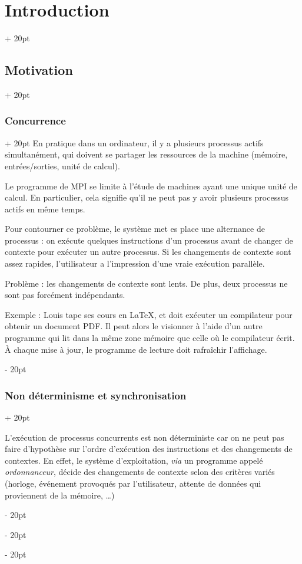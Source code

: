 \documentclass[a4paper, 12pt, twoside]{article}
\newcommand{\ind}[1][20pt]{\advance\leftskip + #1}
\newcommand{\deind}[1][20pt]{\advance\leftskip - #1}
\newenvironment{indt}[2][20pt]{#2 \par \ind[#1]}{\par \deind} %
\begin{document}
\begin{indt}{\section{Introduction}}
\begin{indt}{\subsection{Motivation}}
            \vspace{12pt}
            
            \begin{indt}{\subsubsection{Concurrence}}
                En pratique dans un ordinateur, il y a plusieurs processus actifs simultanément, qui doivent se partager les ressources de la machine (mémoire, entrées/sorties, unité de calcul).

                Le programme de MPI se limite à l'étude de machines ayant une unique unité de calcul.
                En particulier, cela signifie qu'il ne peut pas y avoir plusieurs processus actifs en même temps.

                Pour contourner ce problème, le système met es place une alternance de processus : on exécute quelques instructions d'un processus avant de changer de contexte pour exécuter un autre processus. Si les changements de contexte sont assez rapides, l'utilisateur a l'impression d'une vraie exécution parallèle.

                Problème : les changements de contexte sont lents.
                De plus, deux processus ne sont pas forcément indépendants.

                Exemple : Louis tape ses cours en \LaTeX{}, et doit exécuter un compilateur pour obtenir un document PDF. Il peut alors le visionner à l'aide d'un autre programme qui lit dans la même zone mémoire que celle où le compilateur écrit.
                À chaque mise à jour, le programme de lecture doit rafraîchir l'affichage.
            \end{indt}

            \vspace{12pt}
            
            \begin{indt}{\subsubsection{Non déterminisme et synchronisation}}
                \label{1.1.3}

                L'exécution de processus concurrents est non déterministe car on ne peut pas faire d'hypothèse sur l'ordre d'exécution des instructions et des changements de contextes.
                En effet, le système d'exploitation, \textit{via} un programme appelé \textit{ordonnanceur}, décide des changements de contexte selon des critères variés (horloge, événement provoqués par l'utilisateur, attente de données qui proviennent de la mémoire, \dots)


\end{indt}
\end{indt}
\end{indt}
\end{document}
